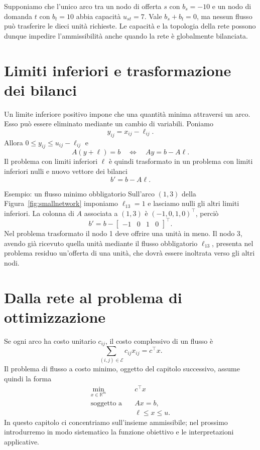 \documentclass[11pt,a4paper]{article}
\newcommand{\R}{\mathbb{R}}
\newcommand{\E}{\mathcal{E}}
\begin{document}
Supponiamo che l'unico arco tra un nodo di offerta $s$ con $b_s=-10$ e un nodo di domanda $t$ con $b_t=10$ abbia capacità $u_{st}=7$. Vale $b_s+b_t=0$, ma nessun flusso può trasferire le dieci unità richieste. Le capacità e la topologia della rete possono dunque impedire l'ammissibilità anche quando la rete è globalmente bilanciata.

\section{Limiti inferiori e trasformazione dei bilanci}

Un limite inferiore positivo impone che una quantità minima attraversi un arco. Esso può essere eliminato mediante un cambio di variabili. Poniamo
\[
  y_{ij}=x_{ij}-\ell_{ij}.
\]
Allora $0\le y_{ij}\le u_{ij}-\ell_{ij}$ e
\[
  A(y+\ell)=b
  \quad\Longleftrightarrow\quad
  Ay=b-A\ell.
\]
Il problema con limiti inferiori $\ell$ è quindi trasformato in un problema con limiti inferiori nulli e nuovo vettore dei bilanci
\begin{equation}
  b'=b-A\ell.
\end{equation}

\begin{examplebox}{Esempio: un flusso minimo obbligatorio}
Sull'arco $(1,3)$ della Figura~\ref{fig:smallnetwork} imponiamo $\ell_{13}=1$ e lasciamo nulli gli altri limiti inferiori. La colonna di $A$ associata a $(1,3)$ è $(-1,0,1,0)^\top$, perciò
\[
  b'=b-\begin{bmatrix}-1&0&1&0\end{bmatrix}^{\top}.
\]
Nel problema trasformato il nodo 1 deve offrire una unità in meno. Il nodo 3, avendo già ricevuto quella unità mediante il flusso obbligatorio $\ell_{13}$, presenta nel problema residuo un'offerta di una unità, che dovrà essere inoltrata verso gli altri nodi.
\end{examplebox}

\section{Dalla rete al problema di ottimizzazione}

Se ogni arco ha costo unitario $c_{ij}$, il costo complessivo di un flusso è
\[
  \sum_{(i,j)\in\E}c_{ij}x_{ij}=c^\top x.
\]
Il problema di flusso a costo minimo, oggetto del capitolo successivo, assume quindi la forma
\begin{equation}\label{eq:mcfpreview}
\begin{aligned}
\min_{x\in\R^m}\quad & c^\top x\\
\text{soggetto a}\quad & Ax=b,\\
& \ell\le x\le u.
\end{aligned}
\end{equation}
In questo capitolo ci concentriamo sull'insieme ammissibile; nel prossimo introdurremo in modo sistematico la funzione obiettivo e le interpretazioni applicative.
\end{document}
